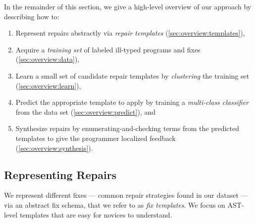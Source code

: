 In the remainder of this section, we give a high-level overview of our approach 
by describing how to:

\begin{enumerate}

  \item Represent repairs abstractly via \emph{repair templates} 
        (\autoref{sec:overview:templates}), 

  \item Acquire a \emph{training set} of labeled ill-typed programs and fixes 
        (\autoref{sec:overview:data}),

  \item Learn a small set of candidate repair templates by \emph{clustering} 
        the training set (\autoref{sec:overview:learn}),

  \item Predict the appropriate template to apply by training a \emph{multi-class classifier} 
        from the data set (\autoref{sec:overview:predict}), and  

  \item Synthesize repairs by enumerating-and-checking terms from the 
        predicted templates to give the programmer localized feedback 
        (\autoref{sec:overview:synthesis}).

\end{enumerate}

\begin{comment}
\emph{fixing} an erroneous program as a \emph{supervised multi-class classification problem}, whose results
are then fed to a \emph{program synthesizer}. A multi-class classification
problem entails learning a function that maps inputs to a discrete set of
usually more than two output labels. A supervised learning problem is one in
with an available training set where the inputs and labels are known, and the
task is to learn a function that accurately maps the inputs to output labels and
generalizes to future inputs. Finally, program synthesis is a problem where,
given a input high-level specification, a new program over some language is
requested as output.
\end{comment}

\subsection{Representing Repairs}
\label{sec:overview:templates} 

We represent different fixes --- \ie common repair 
strategies found in our dataset --- via an abstract 
fix schema, that we refer to as \emph{fix templates}. 
We focus on AST-level templates that are easy for 
novices to understand.

